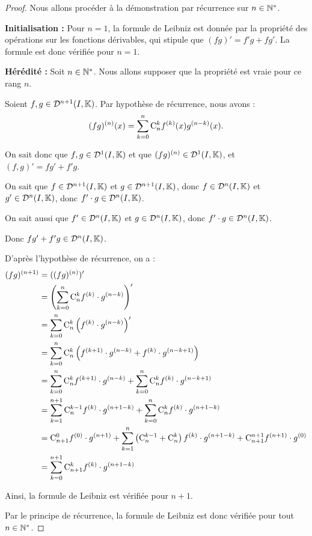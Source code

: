 \documentclass[12pt, a4paper]{report}
\begin{document}
\begin{proof}
  Nous allons procéder à la démonstration par récurrence sur $n\in\mathbb{N}^*$.

  \textbf{Initialisation :} Pour $n=1$, la formule de Leibniz est donnée par la propriété des opérations sur les fonctions dérivables, qui stipule que $(fg)' = f'g + fg'$. La formule est donc vérifiée pour $n=1$.

  \textbf{Hérédité :} Soit $n \in \mathbb{N}^*$. Nous allons supposer que la propriété est vraie pour ce rang $n$.

  Soient $f,g \in \mathcal{D}^{n+1}(I,\mathbb{K})$. Par hypothèse de récurrence, nous avons :
  \[(fg)^{(n)}(x) = \sum_{k=0}^{n} \mathrm{C}_{n}^{k} f^{(k)}(x) g^{(n-k)}(x).\]

  On sait donc que $f,g\in\mathcal{D}^1(I,\mathbb{K})$ et que $(fg)^{(n)} \in \mathcal{D}^1(I,\mathbb{K})$, et $(f,g)'=fg'+f'g$.

  On sait que $f \in \mathcal{D}^{n+1}(I,\mathbb{K})$ et $g \in \mathcal{D}^{n+1}(I,\mathbb{K})$, donc $f \in \mathcal{D}^n(I,\mathbb{K})$ et $g' \in \mathcal{D}^n(I,\mathbb{K})$, donc $f'\cdot g\in \mathcal{D}^{n}(I,\mathbb{K})$.

  On sait aussi que $f' \in \mathcal{D}^n(I,\mathbb{K})$ et $g \in \mathcal{D}^n(I,\mathbb{K})$, donc $f'\cdot g\in \mathcal{D}^{n}(I,\mathbb{K})$.

  Donc $fg' + f'g \in \mathcal{D}^n(I,\mathbb{K})$.

  D'après l'hypothèse de récurrence, on a :
  \begin{align*}
    (fg)^{(n+1)} &= ((fg)^{(n)})' \\
    &= \left(\sum_{k=0}^{n}\mathrm{C}_{n}^{k} f^{(k)}\cdot g^{(n-k)}\right)' \\
    &= \sum_{k=0}^{n}\mathrm{C}_{n}^{k} \left(f^{(k)}\cdot g^{(n-k)}\right)' \\
    &= \sum_{k=0}^{n}\mathrm{C}_{n}^{k} \left(f^{(k+1)}\cdot g^{(n-k)} + f^{(k)}\cdot g^{(n-k+1)}\right) \\
    &= \sum_{k=0}^{n}\mathrm{C}_{n}^{k} f^{(k+1)}\cdot g^{(n-k)} + \sum_{k=0}^{n}\mathrm{C}_{n}^{k} f^{(k)}\cdot g^{(n-k+1)} \\
    &= \sum_{k=1}^{n+1}\mathrm{C}_{n}^{k-1} f^{(k)}\cdot g^{(n+1-k)} + \sum_{k=0}^{n}\mathrm{C}_{n}^{k} f^{(k)}\cdot g^{(n+1-k)} \\
    &= \mathrm{C}_{n+1}^{0} f^{(0)}\cdot g^{(n+1)} + \sum_{k=1}^{n} \left(\mathrm{C}_{n}^{k-1} + \mathrm{C}_{n}^{k}\right) f^{(k)}\cdot g^{(n+1-k)} + \mathrm{C}_{n+1}^{n+1} f^{(n+1)}\cdot g^{(0)} \\
    &= \sum_{k=0}^{n+1} \mathrm{C}_{n+1}^{k} f^{(k)}\cdot g^{(n+1-k)}
  \end{align*}

  Ainsi, la formule de Leibniz est vérifiée pour $n+1$.

  Par le principe de récurrence, la formule de Leibniz est donc vérifiée pour tout $n \in \mathbb{N}^*$.
\end{proof}
\end{document}
